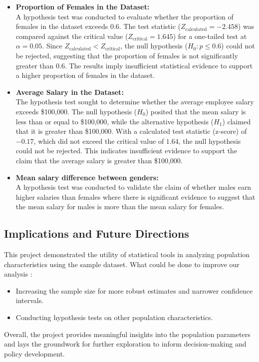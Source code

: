 \documentclass[12pt,a4paper]{article}
\begin{document}
\vspace{0.5cm}
\begin{itemize}
 
    \item \textbf{Proportion of Females in the Dataset:  } \\
    A hypothesis test was conducted to evaluate whether the proportion of females in the dataset exceeds 0.6. The test statistic (\(Z_{\text{calculated}} = -2.458\)) was compared against the critical value (\(Z_{\text{critical}} = 1.645\)) for a one-tailed test at \(\alpha = 0.05\). Since \(Z_{\text{calculated}} < Z_{\text{critical}}\), the null hypothesis (\(H_0: p \leq 0.6\)) could not be rejected, suggesting that the proportion of females is not significantly greater than 0.6. The results imply insufficient statistical evidence to support a higher proportion of females in the dataset.


    \item \textbf{Average Salary in the Dataset:} \\
The hypothesis test sought to determine whether the average employee salary exceeds \$100,000. The null hypothesis (\(H_0\)) posited that the mean salary is less than or equal to \$100,000, while the alternative hypothesis (\(H_1\)) claimed that it is greater than \$100,000. With a calculated test statistic (z-score) of \(-0.17\), which did not exceed the critical value of \(1.64\), the null hypothesis could not be rejected. This indicates insufficient evidence to support the claim that the average salary is greater than \$100,000. 

    \item \textbf{Mean salary difference between genders:} \\
    A hypothesis test was conducted to validate the claim of whether males earn higher salaries than females where there is significant evidence to suggest that the mean salary for males is
more than the mean salary for females.
    
\end{itemize}
\newpage
\subsection{Implications and Future Directions}
This project demonstrated the utility of statistical tools in analyzing population characteristics using the sample dataset. What could be done to improve our analysis :

\begin{itemize}
    \item Increasing the sample size for more robust estimates and narrower confidence intervals.
    \item Conducting hypothesis tests on other population characteristics.
\end{itemize}

Overall, the project provides meaningful insights into the population parameters and lays the groundwork for further exploration to inform decision-making and policy development.




\newpage
\end{document}
